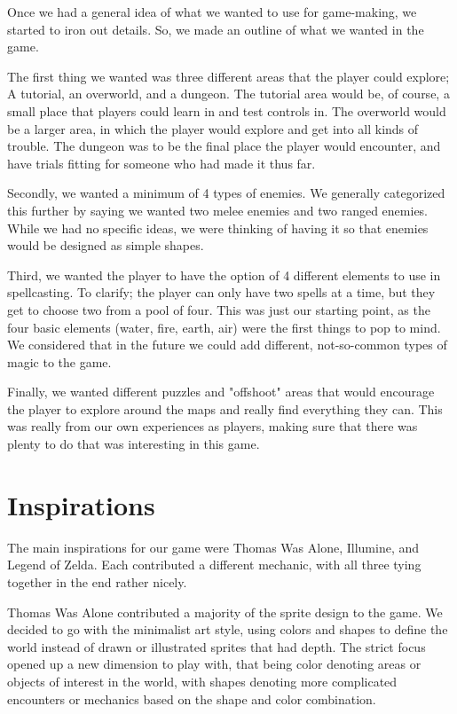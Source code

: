 \documentclass{sigchi}
\begin{document}
Once we had a general idea of what we wanted to use for game-making, we started to iron out details. So, we made an outline of what we wanted in the game.

The first thing we wanted was three different areas that the player could explore; A tutorial, an overworld, and a dungeon. The tutorial area would be, of course,
a small place that players could learn in and test controls in. The overworld would be a larger area, in which the player would explore and get into all kinds of
trouble. The dungeon was to be the final place the player would encounter, and have trials fitting for someone who had made it thus far.

Secondly, we wanted a minimum of 4 types of enemies. We generally categorized this further by saying we wanted two melee enemies and two ranged enemies. While
we had no specific ideas, we were thinking of having it so that enemies would be designed as simple shapes.

Third, we wanted the player to have the option of 4 different elements to use in spellcasting. To clarify; the player can only have two spells at a time, but they
get to choose two from a pool of four. This was just our starting point, as the four basic elements (water, fire, earth, air) were the first things to pop to mind.
We considered that in the future we could add different, not-so-common types of magic to the game.

Finally, we wanted different puzzles and "offshoot" areas that would encourage the player to explore around the maps and really find everything they can. This was
really from our own experiences as players, making sure that there was plenty to do that was interesting in this game.

\newpage

\section{Inspirations}
The main inspirations for our game were Thomas Was Alone, Illumine, and Legend of Zelda.  Each contributed a different mechanic, with all three tying together in the end rather nicely.

Thomas Was Alone contributed a majority of the sprite design to the game.  We decided to go with the minimalist art style, using colors and shapes to define the world instead of
drawn or illustrated sprites that had depth.  The strict focus opened up a new dimension to play with, that being color denoting areas or objects of interest in the world, with shapes denoting more complicated encounters or mechanics based on the shape and color combination.
\end{document}

